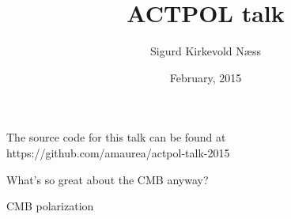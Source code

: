 \documentclass[table]{beamer}
\title{ACTPOL talk}
\author{Sigurd Kirkevold Næss}
\institute{Subdepartment of astrophysics, Oxford University}
\date{February, 2015}
\begin{document}
\begin{frame}
	\titlepage
	\vspace{-1cm}
	\begin{center}
	{\footnotesize The source code for this talk can be found at {\color[rgb]{0,0.7,0}https://github.com/amaurea/actpol-talk-2015}}
	\end{center}
\end{frame}
\begin{frame}{What's so great about the CMB anyway?}
\end{frame}
\begin{frame}{CMB polarization}
\end{frame}
\end{document}
